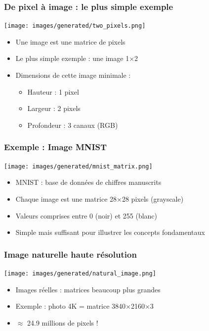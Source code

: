 \documentclass{beamer}
\begin{document}
\begin{frame}
    \frametitle{De pixel à image : le plus simple exemple}
    \begin{center}
        \texttt{[image: images/generated/two\_pixels.png]}
    \end{center}
    \begin{itemize}
        \item Une image est une matrice de pixels
        \item Le plus simple exemple : une image 1×2
        \item Dimensions de cette image minimale :
        \begin{itemize}
            \item Hauteur : 1 pixel
            \item Largeur : 2 pixels
            \item Profondeur : 3 canaux (RGB)
        \end{itemize}
    \end{itemize}
\end{frame}

\begin{frame}
    \frametitle{Exemple : Image MNIST}
    \begin{center}
        \texttt{[image: images/generated/mnist\_matrix.png]}
    \end{center}
    \begin{itemize}
        \item MNIST : base de données de chiffres manuscrits
        \item Chaque image est une matrice 28×28 pixels (grayscale)
        \item Valeurs comprises entre 0 (noir) et 255 (blanc)
        \item Simple mais suffisant pour illustrer les concepts fondamentaux
    \end{itemize}
\end{frame}

\begin{frame}
    \frametitle{Image naturelle haute résolution}
    \begin{center}
        \texttt{[image: images/generated/natural\_image.png]}
    \end{center}
    \begin{itemize}
        \item Images réelles : matrices beaucoup plus grandes
        \item Exemple : photo 4K = matrice 3840×2160×3
        \item \(\approx\) 24.9 millions de pixels !
    \end{itemize}
\end{frame}
\end{document}
